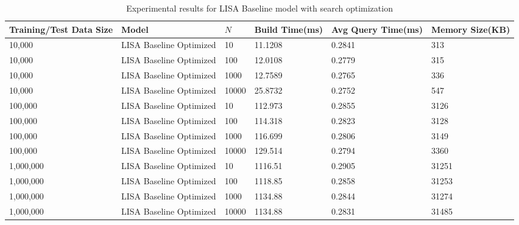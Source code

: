 \begin{table}
	\centering
	\begin{tabular}{||p{}<{\centering}|p{}<{\centering}| p{}<{\centering}|p{}<{\centering}|p{}<{\centering}|p{}<{\centering}||}
		\hline
		Training/Test Data Size& Model & $N$ & Build Time(ms) & Avg Query Time(ms) & Memory Size(KB)\\ [0.5ex] 
		\hline
		\hline
		10,000& LISA Baseline Optimized& 10 & 11.1208 & 0.2841 & 313\\
		\hline
		10,000& LISA Baseline Optimized & 100 & 12.0108 & 0.2779 & 315\\
		\hline
		10,000& LISA Baseline Optimized & 1000 & 12.7589 & 0.2765 & 336\\
		\hline
		10,000& LISA Baseline Optimized & 10000 & 25.8732 & 0.2752 & 547\\
		\hline
		100,000& LISA Baseline Optimized & 10 & 112.973 & 0.2855 & 3126\\
		\hline
		100,000& LISA Baseline Optimized & 100 & 114.318 & 0.2823 & 3128\\
		\hline
		100,000& LISA Baseline Optimized & 1000 & 116.699 & 0.2806 & 3149\\
		\hline
		100,000& LISA Baseline Optimized & 10000 & 129.514 & 0.2794 & 3360\\
		
		\hline
		1,000,000& LISA Baseline Optimized & 10 & 1116.51 & 0.2905 & 31251\\
		\hline
		1,000,000& LISA Baseline Optimized & 100 & 1118.85 &0.2858 & 31253\\
		\hline
		1,000,000& LISA Baseline Optimized & 1000 & 1134.88 & 0.2844 & 31274\\
		\hline
		1,000,000& LISA Baseline Optimized & 10000 & 1134.88 & 0.2831 & 31485\\
		
		\hline
		\hline
	\end{tabular}
	\caption{Experimental results for LISA Baseline model with search optimization}
	\label{baseline_search_optimization_10000}

\end{table}


